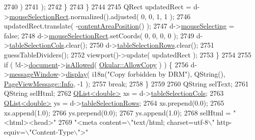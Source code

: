 \begin{DoxyCode}
{{2740                             )
2741                         );
2742                     \}
2743                 \}
2744 
2745                 QRect updatedRect = d->\hyperlink{classPageViewPrivate_a94473cb593838a977bea89214bd1ef66}{mouseSelectionRect}.normalized().adjusted( 0, 0, 1,
       1 );
2746                 updatedRect.translate( -\hyperlink{classPageView_a055aaf87367b9ad0dcfcdc3d2f5ff619}{contentAreaPosition}() );
2747                 d->\hyperlink{classPageViewPrivate_a8819b152a8279b75359af2a3e0567681}{mouseSelecting} = \textcolor{keyword}{false};
2748                 d->\hyperlink{classPageViewPrivate_a94473cb593838a977bea89214bd1ef66}{mouseSelectionRect}.setCoords( 0, 0, 0, 0 );
2749                 d->\hyperlink{classPageViewPrivate_a9d6389f129073d1af9973814a2b1d418}{tableSelectionCols}.clear();
2750                 d->\hyperlink{classPageViewPrivate_afa6ab874498223c0f7788831a67ef007}{tableSelectionRows}.clear();
2751                 guessTableDividers();
2752                 viewport()->update( updatedRect );
2753             \}
2754 
2755             \textcolor{keywordflow}{if} ( !d->\hyperlink{classPageViewPrivate_a50645b9853306cffd74e51efb677e5b4}{document}->\hyperlink{classOkular_1_1Document_a6dd7a475b14222c07d1c410311f35cdb}{isAllowed}( \hyperlink{namespaceOkular_a3601f4e702453ddf1125476dd6e7577ba36a60050e67a446a5ff61aac6756718c}{Okular::AllowCopy} ) ) \{
2756                 d->\hyperlink{classPageViewPrivate_aa836af37149ea9fbfefd8de357c9194b}{messageWindow}->\hyperlink{classPageViewMessage_a7fd107b1b7a6c0ae64a4d09fc2467982}{display}( i18n(\textcolor{stringliteral}{"Copy forbidden by DRM"}), QString(), 
      \hyperlink{classPageViewMessage_aeb83801b92379715663d5a7beaa2ae0ca2ae901576662b28f92067841a52e11dd}{PageViewMessage::Info}, -1 );
2757                 \textcolor{keywordflow}{break};
2758             \}
2759 
2760             QString selText;
2761             QString selHtml;
2762             \hyperlink{classQList}{QList<double>} xs = d->\hyperlink{classPageViewPrivate_a9d6389f129073d1af9973814a2b1d418}{tableSelectionCols};
2763             \hyperlink{classQList}{QList<double>} ys = d->\hyperlink{classPageViewPrivate_afa6ab874498223c0f7788831a67ef007}{tableSelectionRows};
2764             xs.prepend(0.0);
2765             xs.append(1.0);
2766             ys.prepend(0.0);
2767             ys.append(1.0);
2768             selHtml = \textcolor{stringliteral}{"<html><head>"}
2769                       \textcolor{stringliteral}{"<meta content=\(\backslash\)"text/html; charset=utf-8\(\backslash\)" http-equiv=\(\backslash\)"Content-Type\(\backslash\)">"}
}}
\end{DoxyCode}
